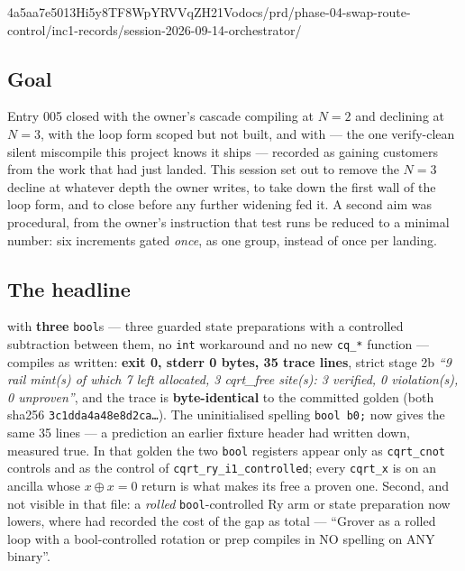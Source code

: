 %
  {4a5aa7e5}{013Hi5y8TF8WpYRVVqZH21Vo}{docs/prd/phase-04-swap-route-control/inc1-records/session-2026-09-14-orchestrator/}

\subsection*{Goal}
Entry 005 closed with the owner's cascade compiling at \(N=2\) and declining at \(N=3\), with the loop form
scoped but not built, and with  --- the one verify-clean silent miscompile this project knows it
ships --- recorded as gaining customers from the work that had just landed. This session set out to remove
the \(N=3\) decline at whatever depth the owner writes, to take down the first wall of the loop form, and to
close  before any further widening fed it. A second aim was procedural, from the owner's instruction
that test runs be reduced to a minimal number: six increments gated \emph{once}, as one group, instead of
once per landing.

\subsection*{The headline}
 with \textbf{three} \texttt{bool}s --- three guarded state
preparations with a controlled subtraction between them, no \texttt{int} workaround and no new
\texttt{cq\_*} function --- compiles as written: \textbf{exit 0, stderr 0 bytes, 35 trace lines}, strict
stage 2b \emph{``9 rail mint(s) of which 7 left allocated, 3 cqrt\_free site(s): 3 verified, 0 violation(s),
0 unproven''}, and the trace is \textbf{byte-identical} to the committed golden (both sha256
\texttt{3c1dda4a48e8d2ca\ldots}). The uninitialised spelling \texttt{bool b0;} now gives the same 35 lines ---
a prediction an earlier fixture header had written down, measured true. In that golden the two \texttt{bool}
registers appear only as \texttt{cqrt\_cnot} controls and as the control of \texttt{cqrt\_ry\_i1\_controlled};
every \texttt{cqrt\_x} is on an ancilla whose \(x \oplus x = 0\) return is what makes its free a proven one.
Second, and not visible in that file: a \emph{rolled} \texttt{bool}-controlled Ry arm or state preparation
now lowers, where  had recorded the cost of the gap as total --- ``Grover as a rolled loop
with a bool-controlled rotation or prep compiles in NO spelling on ANY binary''.

